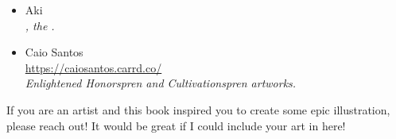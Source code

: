 \begin{itemize}
	\item Aki \\
	\textit{\npcSjaAnat{}, the \npcSjaAnatTitle{}.}
	
	\item Caio Santos \\
	\url{https://caiosantos.carrd.co/} \\
	\textit{Enlightened Honorspren and Cultivationspren artworks.}
\end{itemize}

If you are an artist and this book inspired you to create some epic illustration, please reach out! It would be great if I could include your art in here!

